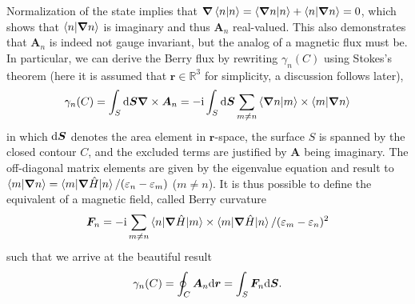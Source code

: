 Normalization of the state implies that $\bm\nabla \braket{n|n} = \braket{\bm\nabla n|n} + \braket{n|\bm\nabla n} = 0$, which shows that $\braket{n|\bm\nabla n}$ is imaginary and thus ${\bm A_n}$ real-valued.
This also demonstrates that $\bm A_n$ is indeed not gauge invariant, but the analog of a magnetic flux must be.
In particular, we can derive the Berry flux by rewriting $\gamma_n(C)$ using Stokes's theorem (here it is assumed that $\bm r\in\mathds R^3$ for simplicity, a discussion follows later),
\begin{align}
    \gamma_n(C) = \int_S\mathrm d{\bm S}{\bm\nabla}\times{\bm A_n} = -\mathrm i\int_S\mathrm d{\bm S} \sum_{m\neq n}\braket{\bm\nabla n|m}\times\braket{m|\bm\nabla n}
    \label{eq:berry_phase_stokes_theorem}
\end{align}
in which $\mathrm d{\bm S}$ denotes the area element in ${\bm r}$-space, the surface $S$ is spanned by the closed contour $C$, and the excluded terms are justified by $\bm A$ being imaginary.
The off-diagonal matrix elements are given by the eigenvalue equation and result to $\braket{m|{\bm\nabla} n} = \braket{m|\bm\nabla\hat H|n}/(\varepsilon_n-\varepsilon_m)$ ($m\neq n$).
It is thus possible to define the equivalent of a magnetic field, called Berry curvature
\begin{align}
    \bm F_n = -\mathrm i\sum_{m\neq n}\braket{n|\bm\nabla\hat H|m}\times\braket{m|\bm\nabla\hat H|n}/(\varepsilon_m-\varepsilon_n)^2
\end{align}
such that we arrive at the beautiful result
\begin{align}
    \gamma_n(C) = \oint_C{\bm A_n}\mathrm d \bm r = \int_S {\bm F_n} \mathrm d{\bm S}.
\end{align}

